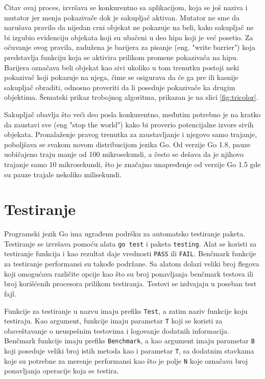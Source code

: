 \documentclass[12pt,oneside]{memoir}
\begin{document}
Čitav ovaj proces, izvršava se konkurentno sa aplikacijom, koja se još naziva i mutator jer menja pokazivače dok je sakupljač aktivan. Mutator ne sme da narušava pravilo da nijedan crni objekat ne pokazuje na beli, kako sakupljač ne bi izgubio evidenciju objekata koji su ubačeni u deo hipa koji je već posetio. Za očuvanje ovog pravila, zadužena je barijera za pisanje (eng. "write barrier") koja predstavlja funkciju koja se aktivira prilikom promene pokazivača na hipu. Barijera označava beli objekat kao sivi ukoliko u tom trenutku postoji neki pokazivač koji pokazuje na njega, čime se osigurava da će ga pre ili kasnije sakupljač obraditi, odnosno proveriti da li poseduje pokazivače ka drugim objektima. Šematski prikaz trobojnog algoritma, prikazan je na slici \ref{fig:tricolor}.

Sakupljač obavlja što veći deo posla konkurentno, međutim potrebno je na kratko da zaustavi sve (eng "stop the world") kako bi proverio potencijalne izvore sivih objekata. Pronalaženje pravog trenutka za zaustavljanje i njegovo samo trajanje, poboljšava se svakom novom distribucijom jezika Go. Od verzije Go 1.8, pauze uobičajeno traju manje od 100 mikrosekundi, a često se dešava da je njihovo trajanje samo 10 mikrosekundi, što je značajno unapređenje od verzije Go 1.5 gde su pauze trajale nekoliko milisekundi.

\section{Testiranje}

Programski jezik Go ima ugrađenu podršku za automatsko testiranje paketa. Testiranje se izvršava pomoću alata \texttt{go test} i paketa \texttt{testing}. Alat se koristi za testiranje funkcija i kao rezultat daje vrednosti \texttt{PASS} ili \texttt{FAIL}. Benčmark funkcije za testiranje performansi su takođe podržane. Sa alatom dolazi veliki broj flegova koji omogućava različite opcije kao što su broj ponavljanja benčmark testova ili broj korišćenih procesora prilikom testiranja. Testovi se izdvajaju u poseban test fajl. 

Funkcije za testiranje u nazvu imaju prefiks \texttt{Test}, a zatim naziv funkcije koju testiraju. Kao argument, funkcije imaju parametar \texttt{T} koji se koristi za obaveštavanje o neuspešnim testovima i logovanje dodatnih informacija. Benčmark funkcije imaju prefiks \texttt{Benchmark}, a kao argument imaju parametar \texttt{B} koji poseduje veliki broj istih metoda kao i parametar \texttt{T}, sa dodatnim stavkama koje su potrebne za merenje performansi kao što je polje \texttt{N} koje označava broj ponavljanja operacije koja se testira.
\end{document}

